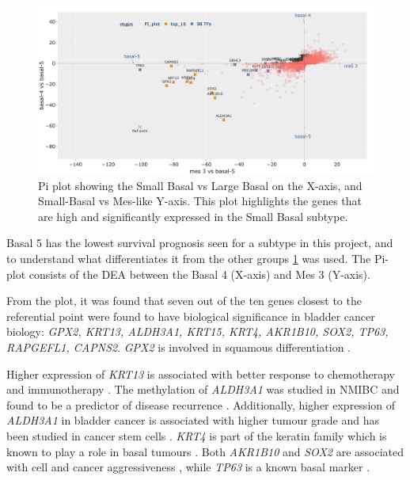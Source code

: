 \begin{figure}[!htb]   
    \centering
    \includegraphics[width=1.0\textwidth,keepaspectratio]{Sections/Network_I/Resources/selective_pruning/pi_gsea/pi_smallBasal.png}
      \caption[Pi-plot - Basal group with the poorest survival]{Pi plot showing the Small Basal vs Large Basal on the X-axis, and Small-Basal vs Mes-like Y-axis. This plot highlights the genes that are high and significantly expressed in the Small Basal subtype. }
    \label{fig:N_I:pi_smallBasal_comp}
\end{figure}


Basal 5 has the lowest survival prognosis seen for a subtype in this project, and to understand what differentiates it from the other groups \cref{fig:N_I:pi_smallBasal_comp} was used. The Pi-plot consists of the DEA between the Basal 4 (X-axis) and Mes 3 (Y-axis).

From the plot, it was found that seven out of the ten genes closest to the referential point were found to have biological significance in bladder cancer biology: \textit{GPX2, KRT13, ALDH3A1, KRT15, KRT4, AKR1B10, SOX2, TP63, RAPGEFL1, CAPNS2}. \textit{GPX2} is involved in squamous differentiation \citet{Naiki2018-fp}. 

Higher expression of \textit{KRT13} is associated with better response to chemotherapy and immunotherapy \citep{Yu2023-db}. The methylation of \textit{ALDH3A1} was studied in \gls{NMIBC} and found to be a predictor of disease recurrence \citep{McLean2023-qk}. Additionally, higher expression of \textit{ALDH3A1} in bladder cancer is associated with higher tumour grade and has been studied in cancer stem cells \citep{Kim2013-th}. \textit{KRT4} is part of the keratin family which is known to play a role in basal tumours \citep{Marzouka2018-ge}. Both \textit{AKR1B10} and \textit{SOX2} are associated with cell and cancer aggressiveness \citep{Huang2021-bn, Chiu2020-xh}, while \textit{TP63} is a known basal marker \citep{Choi2012-kk,Karni-Schmidt2011-ps, Choi2014-ed}. 

